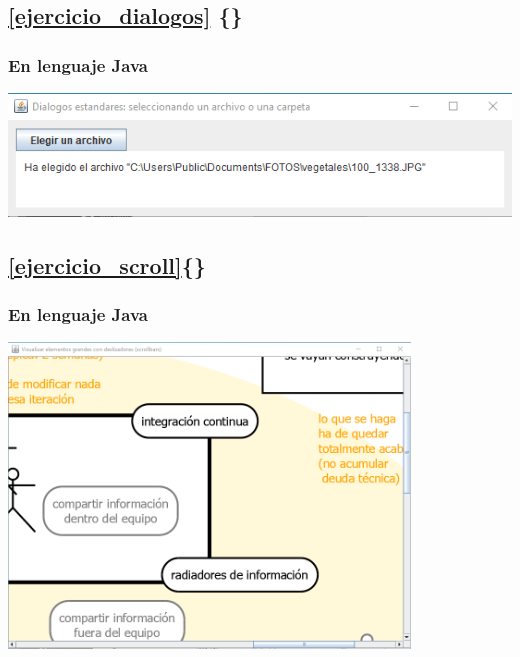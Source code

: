 \documentclass[spanish,12pt,a4paper,final,oneside]{book}
\begin{document}
\vspace{2cm}
\subsection*{\ref{ejercicio_dialogos} \{\}}
\vspace{0.5cm}
\subsubsection*{En lenguaje Java} \lstset{language=Java} 
\includegraphics[width=\textwidth]{Dialogos Estandares - pantallazo - Java}





\vspace{2cm}
\subsection*{\ref{ejercicio_scroll}\{\}}
\vspace{0.5cm}
\subsubsection*{En lenguaje Java} \lstset{language=Java} 
\includegraphics[width=0.8\textwidth]{Scroll - pantallazo - Java}




\end{document}
